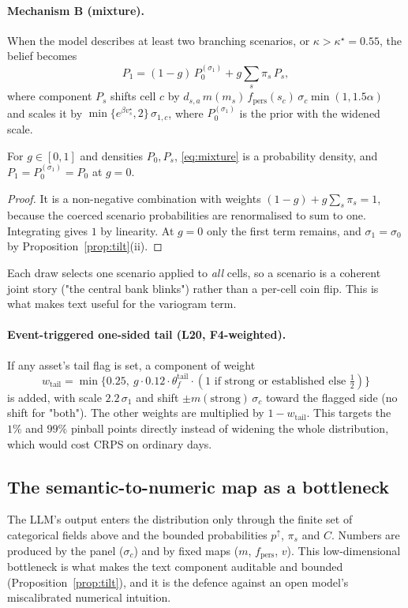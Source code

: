 \paragraph{Mechanism B (mixture).} When the model describes at least two branching scenarios, or $\kappa>\kappa^\star=0.55$, the belief becomes
\begin{equation}\label{eq:mixture}
  P_1=(1-g)\,P_0^{(\sigma_1)}+g\sum_{s}\pi_s\,P_s,
\end{equation}
where component $P_s$ shifts cell $c$ by $d_{s,a}\,m(m_s)\,f_{\mathrm{pers}}(s_c)\,\sigma_c\min(1,1.5\alpha)$ and scales it by
$\min\{e^{\beta v^\star_s},2\}\,\sigma_{1,c}$,
where $P_0^{(\sigma_1)}$ is the prior with the widened scale.

\begin{proposition}\label{prop:mix}
For $g\in[0,1]$ and densities $P_0,P_s$, \eqref{eq:mixture} is a probability density, and $P_1=P_0^{(\sigma_1)}=P_0$ at $g=0$.
\end{proposition}
\begin{proof}
It is a non-negative combination with weights $(1-g)+g\sum_s\pi_s=1$, because the coerced scenario probabilities are renormalised to sum to one.
Integrating gives $1$ by linearity. At $g=0$ only the first term remains, and $\sigma_1=\sigma_0$ by Proposition~\ref{prop:tilt}(ii).
\end{proof}
Each draw selects one scenario applied to \emph{all} cells, so a scenario is a coherent joint story ("the central bank blinks") rather than a
per-cell coin flip. This is what makes text useful for the variogram term.

\paragraph{Event-triggered one-sided tail (L20, F4-weighted).} If any asset's tail flag is set, a component of weight
\begin{equation}
  w_{\mathrm{tail}}=\min\bigl\{0.25,\ g\cdot0.12\cdot\theta^{\mathrm{tail}}_f\cdot(1\text{ if strong or established else }\tfrac12)\bigr\}
\end{equation}
is added, with scale $2.2\,\sigma_1$ and shift $\pm m(\text{strong})\,\sigma_c$ toward the flagged side (no shift for "both"). The other weights are
multiplied by $1-w_{\mathrm{tail}}$. This targets the $1\%$ and $99\%$ pinball points directly instead of widening the whole distribution, which
would cost CRPS on ordinary days.

\subsection{The semantic-to-numeric map as a bottleneck}

The LLM's output enters the distribution only through the finite set of categorical fields above and the bounded probabilities $p^\uparrow$, $\pi_s$
and $C$. Numbers are produced by the panel ($\sigma_c$) and by fixed maps ($m$, $f_{\mathrm{pers}}$, $v$). This low-dimensional bottleneck is what
makes the text component auditable and bounded (Proposition~\ref{prop:tilt}), and it is the defence against an open model's miscalibrated
numerical intuition.
